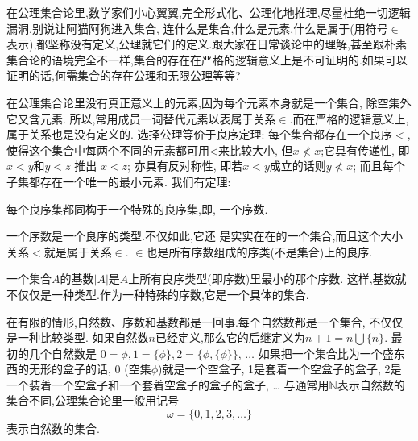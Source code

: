 {在公理集合论里,数学家们小心翼翼,完全形式化、公理化地推理,尽量杜绝一切逻辑漏洞.别说让阿猫阿狗进入集合, 连什么是集合,什么是元素,什么是属于(用符号$\in$表示),都坚称没有定义,公理就它们的定义.跟大家在日常谈论中的理解,甚至跟朴素集合论的语境完全不一样,集合的存在在严格的逻辑意义上是不可证明的.如果可以证明的话,何需集合的存在公理和无限公理等等?

在公理集合论里没有真正意义上的元素,因为每个元素本身就是一个集合, 除空集外它又含元素. 所以,常用成员一词替代元素以表属于关系$\in$.而在严格的逻辑意义上,属于关系也是没有定义的.
选择公理等价于良序定理: 每个集合都存在一个良序$<$,使得这个集合中每两个不同的元素都可用<来比较大小, 但$x\nless x$;它具有传递性, 即 $x<y$和$y<z$ 推出 $x<z$; 
亦具有反对称性, 即若$x<y$成立的话则$y\nless x$;
而且每个子集都存在一个唯一的最小元素.
我们有定理:
\begin{kaishu}每个良序集都同构于一个特殊的良序集,即,
一个序数.
\end{kaishu}一个序数是一个良序的类型.不仅如此,它还
是实实在在的一个集合,而且这个大小关系$<$就是属于关系$\in$.
$\in$也是所有序数组成的序类(不是集合)上的良序.

一个集合$A$的基数$|A|$是$A$上所有良序类型(即序数)里最小的那个序数.
这样,基数就不仅仅是一种类型.作为一种特殊的序数,它是一个具体的集合.

在有限的情形,自然数、序数和基数都是一回事.每个自然数都是一个集合,
不仅仅是一种比较类型.
如果自然数$n$已经定义,那么它的后继定义为$n+1= n\bigcup \{n\}$.
最初的几个自然数是
$0 = \phi, 1 = \{\phi\}, 2 = \{\phi, \{\phi\}\}, \,\dots$
如果把一个集合比为一个盛东西的无形的盒子的话, 0 (空集$\phi$)就是一个空盒子, 1是套着一个空盒子的盒子,
2是一个装着一个空盒子和一个套着空盒子的盒子的盒子, \dots
与通常用$\mathbb{N}$表示自然数的集合不同,公理集合论里一般用记号
$$\omega = \{0, 1, 2, 3, \dots\}$$
表示自然数的集合.

} %

